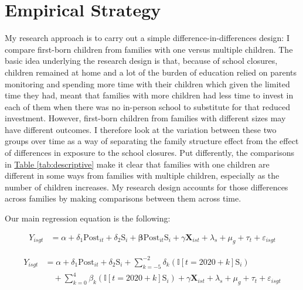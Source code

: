 \section{Empirical Strategy}\label{sec:empirical_strategy}

My research approach is to carry out a simple difference-in-differences design: I compare first-born children from families with one versus multiple children. The basic idea underlying the research design is that, because of school closures, children remained at home and a lot of the burden of education relied on parents monitoring and spending more time with their children which given the limited time they had, meant that families with more children had less time to invest in each of them when there was no in-person school to substitute for that reduced investment. However, first-born children from families with different sizes may have different outcomes. I therefore look at the variation between these two groups over time as a way of separating the family structure effect from the effect of differences in exposure to the school closures. Put differently, the comparisons in \hyperref[tab:descriptive]{Table \ref{tab:descriptive}} make it clear that families with one children are different in some ways from families with multiple children, especially as the number of children increases. My research design accounts for those differences across families by making comparisons between them across time.

Our main regression equation is the following:

    \begin{align}
    Y_{isgt} &= \alpha + \delta_1 \text{Post}_{it} + \delta_2 \text{S}_{i}   + \boldsymbol{\beta} \text{Post}_{it} \text{S}_{i}  + \gamma\mathbf{X}_{ist} + \lambda_s + \mu_g + \tau_t + \varepsilon_{isgt}
    \end{align}

     \begin{align}
    Y_{isgt} &= \alpha + \delta_1 \text{Post}_{it} + \delta_2 \text{S}_{i}   + \sum_{k=-5}^{-2} \delta_k (\mathbb{I}[t = 2020+k] \text{S}_{i}) \nonumber \\
    & \quad + \sum_{k=0}^{4} \beta_k (\mathbb{I}[t = 2020 + k]  \text{S}_{i})  + \gamma\mathbf{X}_{ist} + \lambda_s + \mu_g + \tau_t + \varepsilon_{isgt}
    \end{align}   


